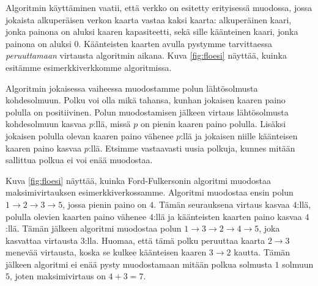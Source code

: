 Algoritmin käyttäminen vaatii, että verkko on esitetty
erityisessä muodossa, jossa jokaista alkuperäisen verkon
kaarta vastaa kaksi kaarta:
alkuperäinen kaari, jonka painona on aluksi kaaren kapasiteetti,
sekä sille kään\-teinen kaari, jonka painona on aluksi $0$.
Käänteisten kaarten avulla pystymme tarvittaessa \emph{peruuttamaan}
virtausta algoritmin aikana.
Kuva \ref{fig:floesi} näyttää, kuinka esitämme esimerkkiverkkomme algoritmissa.

Algoritmin jokaisessa vaiheessa muodostamme polun
lähtösolmusta kohdesolmuun.
Polku voi olla mikä tahansa, kunhan jokaisen kaaren paino
polulla on positiivinen.
Polun muodostamisen jälkeen virtaus lähtösolmusta kohdesolmuun
kasvaa $p$:llä, missä $p$ on pienin kaaren paino polulla.
Lisäksi jokaisen polulla olevan kaaren paino vähenee $p$:llä
ja jokaisen niille käänteisen kaaren paino kasvaa $p$:llä.
Etsimme vastaavasti uusia polkuja, kunnes mitään sallittua
polkua ei voi enää muodostaa.

Kuva \ref{fig:floesi} näyttää, kuinka Ford-Fulkersonin algoritmi muodostaa
maksimivirtauksen esimerkkiverkossamme.
Algoritmi muodostaa ensin polun $1 \rightarrow 2 \rightarrow 3 \rightarrow 5$,
jossa pienin paino on $4$.
Tämän seurauksena virtaus kasvaa $4$:llä,
polulla olevien kaarten paino vähenee $4$:llä
ja käänteisten kaarten paino kasvaa $4$:llä.
Tämän jälkeen algoritmi muodostaa polun
$1 \rightarrow 3 \rightarrow 2 \rightarrow 4 \rightarrow 5$,
joka kasvattaa virtausta $3$:lla.
Huomaa, että tämä polku peruuttaa
kaarta $2 \rightarrow 3$ menevää virtausta,
koska se kulkee käänteisen kaaren $3 \rightarrow 2$ kautta.
Tämän jälkeen algoritmi ei enää pysty muodostamaan mitään polkua
solmusta $1$ solmuun $5$, joten maksimivirtaus on $4+3=7$.

